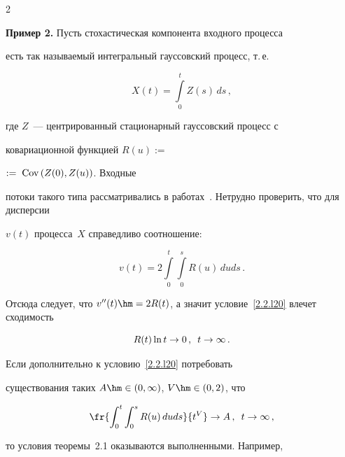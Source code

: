 \begin{multicols}{2}
\noindent


\textbf{Пример 2.} Пусть стохастическая компонента входного процесса


есть так называемый интегральный гауссовский процесс, т.\,е.


\begin{equation}


X(t)=\int\limits_0^t Z(s)\,ds\,,


\label{41}


\end{equation}


где $Z$~--- центрированный стационарный гауссовский процесс с


ковариационной функцией $R(u):=$\linebreak 


$:=\;\mathrm{Cov}\left(Z(0),Z(u)\right)$. Входные


потоки такого типа рассматрива\-лись в работах~\cite{Debicki1,Kulkarni}. Нетрудно проверить, что для дисперсии


$v(t)$ процесса~$X$ справедливо соотношение:


\begin{equation}


v(t)=2 \int\limits_0^t\!\! \int\limits_0^s R(u)\,duds\,.\label{42a}


\end{equation}


Отсюда следует, что $v''(t)\hm=2 R(t)$, а значит условие~\eqref{2.2.l20} влечет сходимость


\begin{equation*}


R(t)\ln t \to 0\,,\enskip t \to \infty\,. 




\end{equation*}


Если дополнительно к условию~\eqref{2.2.l20} потребовать


существования таких  $A \hm\in (0,\infty)$, $V \hm\in (0,2)$, что


\begin{equation}


\fr{\int_0^t \int_0^s R(u)\,duds}{t^V} \to A\,,\enskip


t \to \infty\,,


\label{2.2.l22}


\end{equation}


то условия теоремы~2.1 оказываются выполненными. Например,



\end{multicols}
